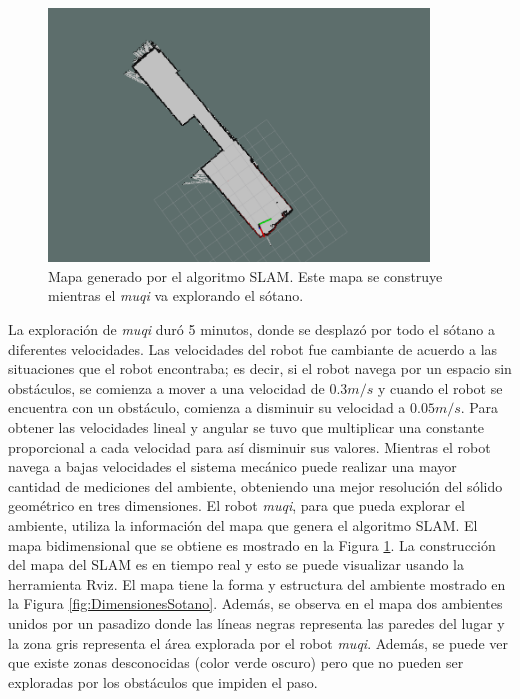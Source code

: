 \begin{figure}
  \centering \footnotesize
  \includegraphics[width=0.90\textwidth]{images/2DSotanoSLAM.png}
  \captionsetup{font=footnotesize}
  \caption{Mapa generado por el algoritmo SLAM. Este mapa se construye mientras el
  \textit{muqi} va explorando el sótano.}
  \label{fig:slamSotano}
\end{figure}

La exploración de \textit{muqi} duró 5 minutos, donde se desplazó por todo el 
sótano a diferentes velocidades. Las velocidades del robot fue cambiante de 
acuerdo a las situaciones que el robot encontraba; es decir, si el robot navega 
por un espacio sin obstáculos, se comienza a mover a una velocidad de $0.3 m/s$ 
y cuando el robot se encuentra con un obstáculo, comienza a disminuir su velocidad 
a $0.05 m/s$. Para obtener las velocidades lineal y angular se tuvo que multiplicar 
una constante proporcional a cada velocidad para así disminuir sus valores. Mientras 
el robot navega a bajas velocidades el sistema mecánico puede realizar una mayor 
cantidad de mediciones del ambiente, obteniendo una mejor resolución del sólido 
geométrico en tres dimensiones. El robot \textit{muqi}, para que pueda explorar 
el ambiente, utiliza la información del mapa que genera el algoritmo SLAM. El 
mapa bidimensional que se obtiene es mostrado en la Figura \ref{fig:slamSotano}. La 
construcción del mapa del SLAM es en tiempo real y esto se puede visualizar 
usando la herramienta Rviz. El mapa tiene la forma y estructura del ambiente 
mostrado en la Figura \ref{fig:DimensionesSotano}. Además, se observa en el 
mapa dos ambientes unidos por un pasadizo donde las líneas negras representa las 
paredes del lugar y la zona gris representa el área explorada por el robot 
\textit{muqi}. Además, se puede ver que existe zonas desconocidas (color verde 
oscuro) pero que no pueden ser exploradas por los obstáculos que impiden el paso.



